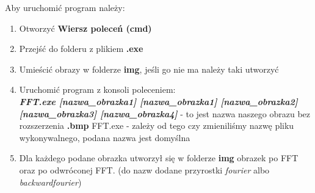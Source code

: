 Aby uruchomić program należy:
\begin{enumerate}
	\item Otworzyć \textbf{Wiersz poleceń (cmd)}
	\item Przejść do folderu z plikiem \textbf{.exe}
	\item Umieścić obrazy w folderze \textbf{img}, jeśli go nie ma należy taki utworzyć
	\item Uruchomić program z konsoli poleceniem:\\
	 \textbf{\textit{FFT.exe [nazwa\_obrazka1] [nazwa\_obrazka1] [nazwa\_obrazka2] [nazwa\_obrazka3] [nazwa\_obrazka4]}}
	  - to jest nazwa naszego obrazu bez rozszerzenia \textbf{.bmp}
	 \subitem FFT.exe - zależy od tego czy zmieniliśmy nazwę pliku wykonywalnego, podana nazwa jest domyślna
	\item Dla każdego podane obrazka utworzył się w folderze \textbf{img} obrazek po FFT oraz po odwróconej FFT. (do nazw dodane przyrostki \textit{fourier} albo \textit{backwardfourier})
\end{enumerate} 
\clearpage\newpage
